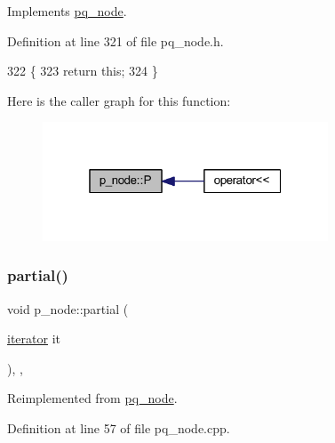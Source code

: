Implements \mbox{\hyperlink{classpq__node_a72178a268ee1ece3ac106ac5fea3b12c}{pq\+\_\+node}}.



Definition at line 321 of file pq\+\_\+node.\+h.


\begin{DoxyCode}
322     \{
323     \textcolor{keywordflow}{return} \textcolor{keyword}{this};
324     \}
\end{DoxyCode}
Here is the caller graph for this function\+:\nopagebreak
\begin{figure}[H]
\begin{center}
\leavevmode
\includegraphics[width=241pt]{classp__node_a4d8d7a171935a008f0718275dede2b43_icgraph}
\end{center}
\end{figure}
\mbox{\label{classp__node_a217e83b61144fe6b64e3fbade0aecfcf}} 
\subsubsection{\texorpdfstring{partial()}{partial()}}
{\footnotesize\ttfamily void p\+\_\+node\+::partial (\begin{DoxyParamCaption}\item[{\mbox{\hyperlink{classpq__node_a34898c9eb1527787c07e8ebefd6bfba5}{iterator}}}]{it }\end{DoxyParamCaption})\hspace{0.3cm}{\ttfamily [inline]}, {\ttfamily [private]}, {\ttfamily [virtual]}}



Reimplemented from \mbox{\hyperlink{classpq__node_aa6830ab47a280f41fe61b7d2f8b508bb}{pq\+\_\+node}}.



Definition at line 57 of file pq\+\_\+node.\+cpp.


